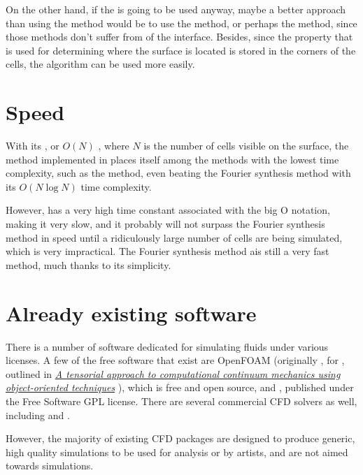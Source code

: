 On the other hand, if the \FVM is going to be used anyway, maybe a better approach than using the \VOF method would be to use the \LS method, or perhaps the \CLSVOF method, since those methods don't suffer from \diffusion of the interface. Besides, since the property that is used for determining where the surface is located is stored in the corners of the cells, the  algorithm can be used more easily.

\section{Speed}

With its , or $O(N)$ , where $N$ is the number of cells visible on the surface, the method implemented in \thisprojectwork places itself among the methods with the lowest time complexity, such as the \LPD method, even beating the Fourier synthesis method with its $O(N \log N)$ time complexity.

However, \thismethod has a very high time constant associated with the big O notation, making it very slow, and it probably will not surpass the Fourier synthesis method in speed until a ridiculously large number of cells are being simulated, which is very impractical. The Fourier synthesis method ais still a very fast method, much thanks to its simplicity.

\section{Already existing software}

There is a number of software dedicated for simulating fluids under various licenses. A few of the free software  that exist are OpenFOAM (originally , for \textit{}, outlined in \textit{\href{http://powerlab.fsb.hr/ped/kturbo/openfoam/docs/foam.pdf}{A tensorial approach to computational continuum mechanics using object-oriented techniques}} \citep{temp}), which is free and open source, and \Gerris \citep{temp}, published under the Free Software GPL license. There are several commercial CFD solvers as well, including \RealFlow and . %

However, the majority of existing CFD packages are designed to produce generic, high quality simulations to be used for analysis or by artists, and are not aimed towards \realtime simulations.
